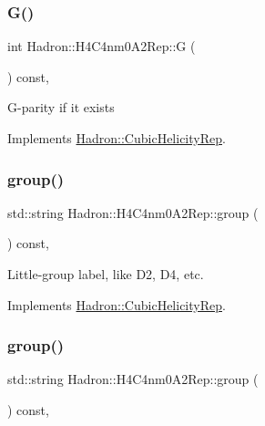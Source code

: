 \subsubsection{\texorpdfstring{G()}{G()}\hspace{0.1cm}{\footnotesize\ttfamily [3/3]}}
{\footnotesize\ttfamily int Hadron\+::\+H4\+C4nm0\+A2\+Rep\+::G (\begin{DoxyParamCaption}{ }\end{DoxyParamCaption}) const\hspace{0.3cm}{\ttfamily [inline]}, {\ttfamily [virtual]}}

G-\/parity if it exists 

Implements \mbox{\hyperlink{structHadron_1_1CubicHelicityRep_a50689f42be1e6170aa8cf6ad0597018b}{Hadron\+::\+Cubic\+Helicity\+Rep}}.

\mbox{\label{structHadron_1_1H4C4nm0A2Rep_a9424437b4e8f2230697222a77fe7b3e0}} 
\subsubsection{\texorpdfstring{group()}{group()}\hspace{0.1cm}{\footnotesize\ttfamily [1/5]}}
{\footnotesize\ttfamily std\+::string Hadron\+::\+H4\+C4nm0\+A2\+Rep\+::group (\begin{DoxyParamCaption}{ }\end{DoxyParamCaption}) const\hspace{0.3cm}{\ttfamily [inline]}, {\ttfamily [virtual]}}

Little-\/group label, like D2, D4, etc. 

Implements \mbox{\hyperlink{structHadron_1_1CubicHelicityRep_a101a7d76cd8ccdad0f272db44b766113}{Hadron\+::\+Cubic\+Helicity\+Rep}}.

\mbox{\label{structHadron_1_1H4C4nm0A2Rep_a9424437b4e8f2230697222a77fe7b3e0}} 
\subsubsection{\texorpdfstring{group()}{group()}\hspace{0.1cm}{\footnotesize\ttfamily [2/5]}}
{\footnotesize\ttfamily std\+::string Hadron\+::\+H4\+C4nm0\+A2\+Rep\+::group (\begin{DoxyParamCaption}{ }\end{DoxyParamCaption}) const\hspace{0.3cm}{\ttfamily [inline]}, {\ttfamily [virtual]}}


